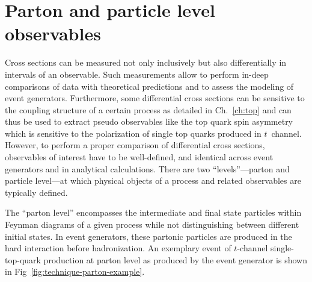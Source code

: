 \section{Parton and particle level observables}

Cross sections can be measured not only inclusively but also differentially in intervals of an observable. Such measurements allow to perform in-deep comparisons of data with theoretical predictions and to assess the modeling of event generators. Furthermore, some differential cross sections can be sensitive to the coupling structure of a certain process as detailed in Ch.~\ref{ch:top} and can thus be used to extract pseudo observables like the top quark spin asymmetry which is sensitive to the polarization of single top quarks produced in $t$~channel. However, to perform a proper comparison of differential cross sections, observables of interest have to be well-defined, and identical across event generators and in analytical calculations. There are two ``levels''---parton and particle level---at which physical objects of a process and related observables are typically defined.

The ``parton level'' encompasses the intermediate and final state particles within Feynman diagrams of a given process while not distinguishing between different initial states. In event generators, these partonic particles are produced in the hard interaction before hadronization. An exemplary event of $t$-channel single-top-quark production at parton level as produced by the \POWHEG event generator is shown in Fig~\ref{fig:technique-parton-example}. 


